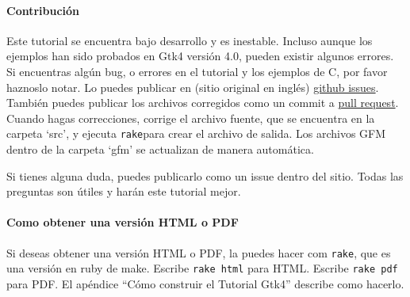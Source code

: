 \hypertarget{contribuciuxf3n}{%
\paragraph{Contribución}\label{contribuciuxf3n}}

Este tutorial se encuentra bajo desarrollo y es inestable. Incluso
aunque los ejemplos han sido probados en Gtk4 versión 4.0, pueden
existir algunos errores. Si encuentras algún bug, o errores en el
tutorial y los ejemplos de C, por favor haznoslo notar. Lo puedes
publicar en (sitio original en inglés)
\href{https://github.com/ToshioCP/Gtk4-tutorial/issues}{github issues}.
También puedes publicar los archivos corregidos como un commit a
\href{https://github.com/ToshioCP/Gtk4-tutorial/pulls}{pull request}.
Cuando hagas correcciones, corrige el archivo fuente, que se encuentra
en la carpeta `src', y ejecuta \passthrough{\lstinline!rake!}para crear
el archivo de salida. Los archivos GFM dentro de la carpeta `gfm' se
actualizan de manera automática.

Si tienes alguna duda, puedes publicarlo como un issue dentro del sitio.
Todas las preguntas son útiles y harán este tutorial mejor.

\hypertarget{como-obtener-una-versiuxf3n-html-o-pdf}{%
\paragraph{Como obtener una versión HTML o
PDF}\label{como-obtener-una-versiuxf3n-html-o-pdf}}

Si deseas obtener una versión HTML o PDF, la puedes hacer com
\passthrough{\lstinline!rake!}, que es una versión en ruby de make.
Escribe \passthrough{\lstinline!rake html!} para HTML. Escribe
\passthrough{\lstinline!rake pdf!} para PDF. El apéndice ``Cómo
construir el Tutorial Gtk4'' describe como hacerlo.
